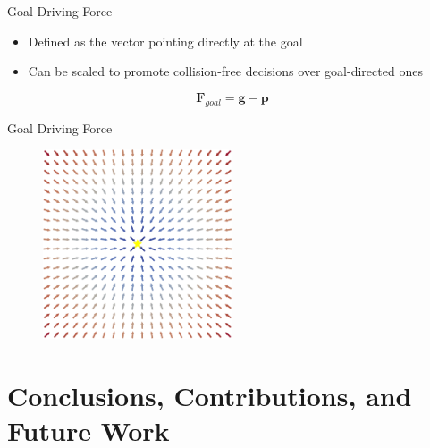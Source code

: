 \documentclass[aspectratio=169,xcolor=dvipsnames]{beamer}
\begin{document}
\begin{frame}{Goal Driving Force}
  \begin{itemize}
    \item Defined as the vector pointing directly at the goal
    \item Can be scaled to promote collision-free decisions over goal-directed ones
  \end{itemize}
  \[
    \mathbf{F}_{goal} = \mathbf{g} - \mathbf{p}
  \]
\end{frame}

\begin{frame}{Goal Driving Force}
  \begin{figure}
    \includegraphics[width=0.5\textwidth]{imgs/goal_directed_force.png}
  \end{figure}
\end{frame}

\section{Conclusions, Contributions, and Future Work}
\end{document}
